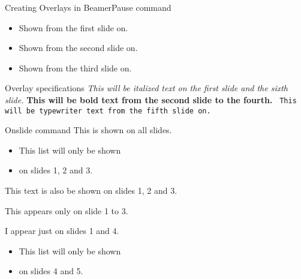 \documentclass{beamer}
\begin{document}
%

\begin{frame}{Creating Overlays in Beamer}{Pause command}
  \begin{itemize}
  \item Shown from the first slide on.
    \pause
  \item Shown from the second slide on.
    \pause
  \item Shown from the third slide on.
  \end{itemize}
\end{frame}

\begin{frame}{Overlay specifications}
  \textit<1,6>{
    This will be italized text on the first slide and the sixth slide.}
  \textbf<2-4>{
    This will be bold text from the second slide to the fourth.}
  \texttt<5->{
    This will be typewriter text from the fifth slide on.}
\end{frame}

\begin{frame}{Onslide command}
  This is shown on all slides.
  \begin{itemize}
  \item This list will only be shown
  \item on slides 1, 2 and 3.
  \end{itemize}
  This text is also be shown on slides 1, 2 and 3.


  This appears only on slide 1 to 3.

  I appear just on slides 1 and 4.

    \begin{itemize}
    \item This list will only be shown
    \item on slides 4 and 5.
    \end{itemize}
\end{frame}
\end{document}
